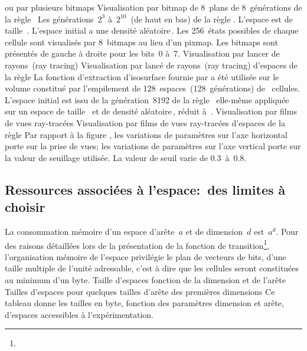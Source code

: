 %
{ou par plusieurs bitmaps}%
{Visualisation par bitmap de 8~plans de 8~générations de la
  règle~}%
{Les générations~$2^{3}$ à~$2^{10}$~(de haut en bas) de la règle
  . %
  L'espace est de taille~. %
  L'espace initial a une densité aléatoire\,\Sundemi. %
  Les 256~états possibles de chaque cellule sont visualisés par
  8~bitmaps au lieu d'un pixmap. %
  Les bitmaps sont présentés de gauche à droite pour les bits~0 à~7.}
%
{Visualisation par lancer de rayons~(ray tracing)}
{Visualisation par lancé de rayons~(ray tracing) d'espaces de la
  règle }%
{La fonction d'extraction d'isosurface fournie par  a
  été utilisée sur le volume constitué par l'empilement de
  128~espaces~(128~générations) de~ cellules. %
  L'espace initial est issu de la génération~8192 de la
  règle~ elle-même appliquée sur un espace de
  taille~ et de densité aléatoire\,\Sundemi, réduit
  à~.}
%
{Visualisation par films de vues ray-tracées}%
{Visualisation par films de vues ray-tracées d'espaces de la
  règle }%
{Par rapport à la figure , les variations de
  paramètres sur l'axe horizontal porte sur la prise de vues; %
  les variations de paramètres sur l'axe vertical porte sur la valeur
  de seuillage utilisée. %
  La valeur de seuil varie de 0.3~à~0.8.}
\clearpage

\subsection{Ressources associées à l'espace:~des limites à choisir}

La consommation mémoire d'un espace d'arête~$a$ et de dimension~$d$
est~$a^{d}$. %
Pour des raisons détaillées lors de la présentation de
la fonction de tran\-si\-tion\footnote{%
 }, %
l'organisation mémoire de l'espace privilégie le plan de vecteurs de
bits, d'une taille multiple de l'unité adressable, c'est à dire que
les cellules seront constituées au minimum d'un byte.
{Taille d'espaces fonction de la dimension et
  de l'arête}%
{Tailles d'espaces pour quelques tailles d'arête des premières dimensions}%
{Ce tableau donne les tailles en byte, fonction des paramètres dimension
  et arête, d'espaces accessibles à l'expérimentation.}

